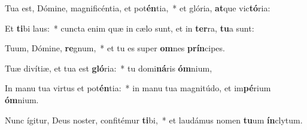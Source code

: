 \item Tua est, Dómine, magnificéntia, et pot\textbf{én}tia,~* et glória, \textbf{at}que vic\textbf{tó}ria:
\item Et \textbf{ti}bi laus:~* cuncta enim quæ in cælo sunt, et in \textbf{ter}ra, \textbf{tu}a sunt:
\item Tuum, Dómine, \textbf{re}gnum,~* et tu es super \textbf{om}nes \textbf{prín}cipes.
\item Tuæ divítiæ, et tua est \textbf{gló}ria:~* tu domi\textbf{ná}ris \textbf{óm}nium,
\item In manu tua virtus et pot\textbf{én}tia:~* in manu tua magnitúdo, et im\textbf{pé}rium \textbf{óm}nium.
\item Nunc ígitur, Deus noster, confitémur \textbf{ti}bi,~* et laudámus nomen \textbf{tu}um \textbf{ín}clytum.
